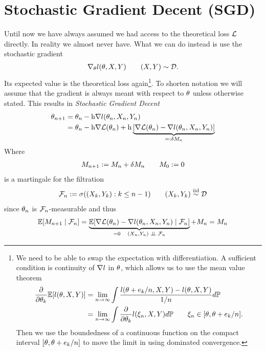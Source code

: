 
\chapter{Stochastic Gradient Decent (SGD)}

Until now we have always assumed we had access to the theoretical loss \(\mathcal{L}\) 
directly. In reality we almost never have. What we can do instead is use the
stochastic gradient
%
\begin{align*}
	\nabla_\theta l (\theta, X,Y) \qquad (X,Y)\sim\mathcal{D}.
\end{align*}
%
Its expected value is the theoretical loss again\footnote{
	We need to be able to swap the expectation with differentiation. A sufficient 
	condition is continuity of \(\nabla l\) in \(\theta\), which allows us
	to use the mean value theorem
	\begin{align*}
		\frac{\partial}{\partial \theta_k}\mathbb{E}[l(\theta, X,Y)]
		&= \lim_{n\to\infty}
		\int\frac{l(\theta+e_k/n, X,Y)-l(\theta,X,Y)}{1/n}d\mathbb{P}
		\\
		&=\lim_{n\to\infty} \int\frac{\partial}{\partial \theta_k}l(\xi_n, X,Y)d\mathbb{P}
		\qquad \xi_n \in [\theta, \theta + e_k/n].
	\end{align*}
	Then we use the boundedness of a continuous function on the compact interval
	\([\theta, \theta + e_k/n]\) to move the limit in using
	dominated convergence.
}. To shorten notation we will assume that the gradient is always meant
with respect to \(\theta\) unless otherwise stated.
This results in \emph{Stochastic Gradient Decent}
%
\begin{align*}
	\theta_{n+1}
	&= \theta_n - \text{h}\nabla l(\theta_n, X_n,Y_n)\\
	&= \theta_n - \text{h}\nabla\mathcal{L}(\theta_n)
	+ \text{h}\underbrace{
		[\nabla\mathcal{L}(\theta_n) - \nabla l(\theta_n, X_n, Y_n)]
	}_{=:\delta M_n}
\end{align*}
Where
\begin{align*}
	M_{n+1} := M_n + \delta M_n \qquad M_0:=0
\end{align*}
is a martingale for the filtration
\begin{align*}
	\mathcal{F}_n :=\sigma((X_k, Y_k): k\le n-1 )
	\qquad (X_k,Y_k)\stackrel{\text{iid}}{\sim}\mathcal{D}
\end{align*}
since \(\theta_n\) is \(\mathcal{F}_n\)-measurable and thus
\begin{align*}
	\mathbb{E}[M_{n+1}\mid \mathcal{F}_n]
	= \underbrace{\mathbb{E}[\nabla\mathcal{L}(\theta_n) - \nabla l(\theta_n, X_n, Y_n)\mid \mathcal{F}_n]}_{
		=0 \quad (X_n,Y_n) \mathrel{\;\perp \!\!\! \perp\;} \mathcal{F}_n
	} + M_n
	= M_n
\end{align*}
